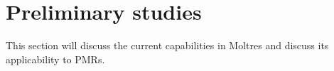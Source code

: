 \section{Preliminary studies}

This section will discuss the current capabilities in Moltres and discuss its applicability to PMRs.
